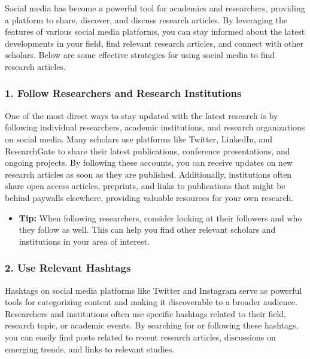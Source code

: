 \documentclass[
]{book}
\providecommand{\tightlist}{%
  \setlength{\itemsep}{0pt}\setlength{\parskip}{0pt}}
\begin{document}
Social media has become a powerful tool for academics and researchers, providing a platform to share, discover, and discuss research articles. By leveraging the features of various social media platforms, you can stay informed about the latest developments in your field, find relevant research articles, and connect with other scholars. Below are some effective strategies for using social media to find research articles.

\subsubsection*{1. Follow Researchers and Research Institutions}\label{follow-researchers-and-research-institutions}

One of the most direct ways to stay updated with the latest research is by following individual researchers, academic institutions, and research organizations on social media. Many scholars use platforms like Twitter, LinkedIn, and ResearchGate to share their latest publications, conference presentations, and ongoing projects. By following these accounts, you can receive updates on new research articles as soon as they are published. Additionally, institutions often share open access articles, preprints, and links to publications that might be behind paywalls elsewhere, providing valuable resources for your own research.

\begin{itemize}
\tightlist
\item
  \textbf{Tip:} When following researchers, consider looking at their followers and who they follow as well. This can help you find other relevant scholars and institutions in your area of interest.
\end{itemize}

\subsubsection*{2. Use Relevant Hashtags}\label{use-relevant-hashtags}

Hashtags on social media platforms like Twitter and Instagram serve as powerful tools for categorizing content and making it discoverable to a broader audience. Researchers and institutions often use specific hashtags related to their field, research topic, or academic events. By searching for or following these hashtags, you can easily find posts related to recent research articles, discussions on emerging trends, and links to relevant studies.
\end{document}
